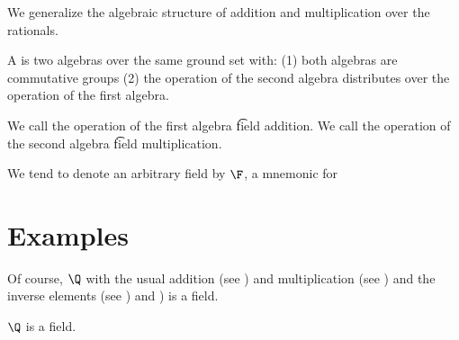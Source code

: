 

We generalize the algebraic structure of addition and multiplication over the rationals.


A  is two algebras over
the same ground set with:
(1) both algebras are commutative groups
(2) the operation of the second algebra
distributes over the operation of the first
algebra.

We call the operation of the first algebra
\t{field addition}.
We call the operation of the second algebra
\t{field multiplication}.


We tend to denote an arbitrary field by $\F$, a mnemonic for 

\section{Examples}

Of course, $\Q$ with the usual addition (see ) and multiplication (see ) and the inverse elements (see ) and ) is a field.

\begin{proposition}
  $\Q$ is a field.
\end{proposition}
